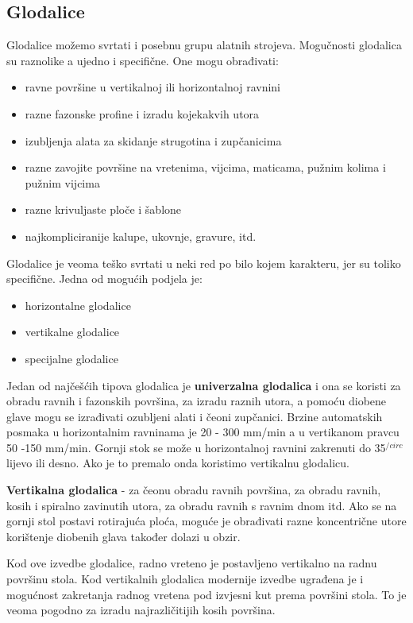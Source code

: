 \documentclass[a4paper,12pt]{article}
\numberwithin{figure}{section}
\begin{document}
\subsection{Glodalice}
Glodalice možemo svrtati i posebnu grupu alatnih strojeva. Mogučnosti glodalica su raznolike a ujedno i specifične. One mogu obrađivati:
\begin{itemize}
\item ravne površine u vertikalnoj ili horizontalnoj ravnini
\item razne fazonske profine i izradu kojekakvih utora
\item izubljenja alata za skidanje strugotina i zupčanicima
\item razne zavojite površine na vretenima, vijcima, maticama, pužnim kolima i pužnim vijcima
\item razne krivuljaste ploče i šablone
\item najkompliciranije kalupe, ukovnje, gravure, itd.
\end{itemize}
Glodalice je veoma teško svrtati u neki red po bilo kojem karakteru, jer su toliko specifične. Jedna od mogućih podjela je:
\begin{itemize}
\item horizontalne glodalice
\item vertikalne glodalice
\item specijalne glodalice
\end{itemize}
Jedan od najčešćih tipova glodalica je \textbf{univerzalna glodalica} i ona se koristi za obradu ravnih i fazonskih površina, za izradu raznih utora, a pomoću diobene glave mogu se izrađivati ozubljeni alati i čeoni zupčanici.
Brzine automatskih posmaka u horizontalnim ravninama je 20 - 300 mm/min a u vertikanom pravcu 50 -150 mm/min. Gornji stok se može u horizontalnoj ravnini zakrenuti do 35$^{/circ}$ lijevo ili desno. Ako je to premalo onda koristimo vertikalnu glodalicu.\par
\textbf{Vertikalna glodalica} - za čeonu obradu ravnih površina, za obradu ravnih, kosih i spiralno zavinutih utora, za obradu ravnih s ravnim dnom itd. Ako se na gornji stol postavi rotirajuća ploća, moguće je obrađivati razne koncentrične utore korištenje diobenih glava također dolazi u obzir.\par
Kod ove izvedbe glodalice, radno vreteno je postavljeno vertikalno na radnu površinu stola. Kod vertikalnih glodalica modernije izvedbe ugrađena je i mogućnost zakretanja radnog vretena pod izvjesni kut prema površini stola. To je veoma pogodno za izradu najrazličitijih kosih površina.\par
\end{document}
